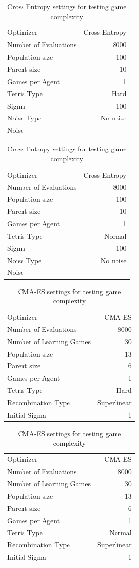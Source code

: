 \begin{table}[h]
\centering
\begin{tabular}{l r}
Optimizer & Cross Entropy\\
Number of Evaluations & 8000\\
Population size & 100\\
Parent size & 10\\
Games per Agent & 1\\
Tetris Type & Hard\\
\hline
Sigma & 100\\
Noise Type & No noise\\
Noise & -
\end{tabular}
\quad
\begin{tabular}{l r}
Optimizer & Cross Entropy\\
Number of Evaluations & 8000\\
Population size & 100\\
Parent size & 10\\
Games per Agent & 1\\
Tetris Type & Normal\\
\hline
Sigma & 100\\
Noise Type & No noise\\
Noise & -
\end{tabular}
\caption{Cross Entropy settings for testing game complexity}
\end{table}

\begin{table}[h]
\centering
\begin{tabular}{l r}
Optimizer & CMA-ES\\
Number of Evaluations & 8000\\
Number of Learning Games & 30\\
Population size& 13\\
Parent size & 6\\
Games per Agent & 1\\
Tetris Type & Hard\\
\hline
Recombination Type & Superlinear\\
Initial Sigma & 1
\end{tabular}
\quad
\begin{tabular}{l r}
Optimizer & CMA-ES\\
Number of Evaluations & 8000\\
Number of Learning Games & 30\\
Population size& 13\\
Parent size & 6\\
Games per Agent & 1\\
Tetris Type & Normal\\
\hline
Recombination Type & Superlinear\\
Initial Sigma & 1
\end{tabular}
\caption{CMA-ES settings for testing game complexity}
\end{table}

